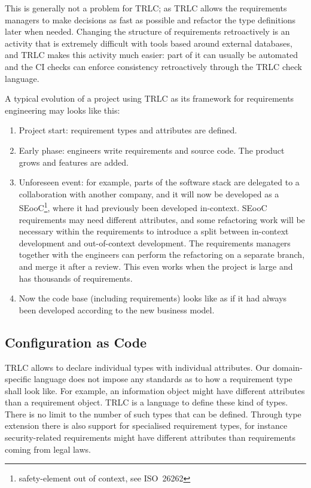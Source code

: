 \documentclass[english]{lni}
\begin{document}
This is generally not a problem for TRLC; as TRLC allows the
requirements managers to make decisions as fast as possible and
refactor the type definitions later when needed.  Changing the
structure of requirements retroactively is an activity that is
extremely difficult with tools based around external databases, and
TRLC makes this activity much easier: part of it can usually be
automated and the CI checks can enforce consistency retroactively
through the TRLC check language.

A typical evolution of a project using TRLC as its framework for
requirements engineering may looks like this:
\begin{enumerate}
\item Project start: requirement types and attributes are defined.
\item Early phase: engineers write requirements and source code.  The
  product grows and features are added.
\item Unforeseen event: for example, parts of the software stack are
  delegated to a collaboration with another company, and it will
  now be developed as a SEooC\footnote{safety-element out of context,
    see ISO~26262}, where it had previously been developed
  in-context.  SEooC requirements may need different attributes, and
  some refactoring work will be necessary within the requirements to
  introduce a split between in-context development and out-of-context
  development.  The requirements managers together with the engineers
  can perform the refactoring on a separate branch, and merge it after
  a review.  This even works when the project is large and has
  thousands of requirements.
\item Now the code base (including requirements) looks like as if it
  had always been developed according to the new business model.
\end{enumerate}


\subsection{Configuration as Code}
TRLC allows to declare individual types with individual attributes.
Our domain-specific language does not impose any standards as to how a
requirement type shall look like.  For example, an information object
might have different attributes than a requirement object.  TRLC is a
language to define these kind of types.  There is no limit to the
number of such types that can be defined.  Through type extension
there is also support for specialised requirement types, for instance
security-related requirements might have different attributes than
requirements coming from legal laws.
\end{document}
